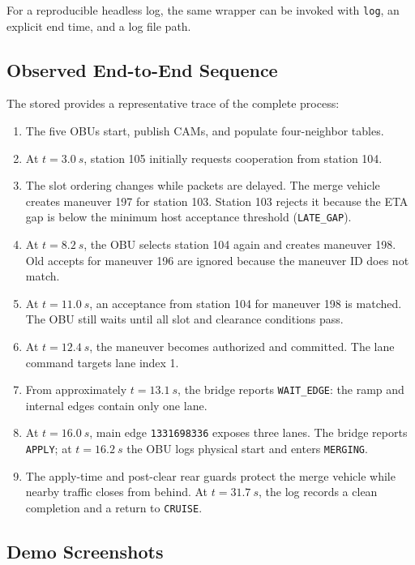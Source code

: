 \documentclass[a4paper,12pt]{article}
\begin{document}
For a reproducible headless log, the same wrapper can be invoked with \texttt{log}, an explicit end time, and a log file path.

\subsection{Observed End-to-End Sequence}

The stored  provides a representative trace of the complete process:

\begin{enumerate}
    \item The five OBUs start, publish CAMs, and populate four-neighbor tables.
    \item At $t=\SI{3.0}{s}$, station 105 initially requests cooperation from station 104.
    \item The slot ordering changes while packets are delayed. The merge vehicle creates maneuver 197 for station 103. Station 103 rejects it because the ETA gap is below the minimum host acceptance threshold (\texttt{LATE\_GAP}).
    \item At $t=\SI{8.2}{s}$, the OBU selects station 104 again and creates maneuver 198. Old accepts for maneuver 196 are ignored because the maneuver ID does not match.
    \item At $t=\SI{11.0}{s}$, an acceptance from station 104 for maneuver 198 is matched. The OBU still waits until all slot and clearance conditions pass.
    \item At $t=\SI{12.4}{s}$, the maneuver becomes authorized and committed. The lane command targets lane index 1.
    \item From approximately $t=\SI{13.1}{s}$, the bridge reports \texttt{WAIT\_EDGE}: the ramp and internal edges contain only one lane.
    \item At $t=\SI{16.0}{s}$, main edge \texttt{1331698336} exposes three lanes. The bridge reports \texttt{APPLY}; at $t=\SI{16.2}{s}$ the OBU logs physical start and enters \texttt{MERGING}.
    \item The apply-time and post-clear rear guards protect the merge vehicle while nearby traffic closes from behind. At $t=\SI{31.7}{s}$, the log records a clean completion and a return to \texttt{CRUISE}.
\end{enumerate}

\subsection{Demo Screenshots}
\end{document}
